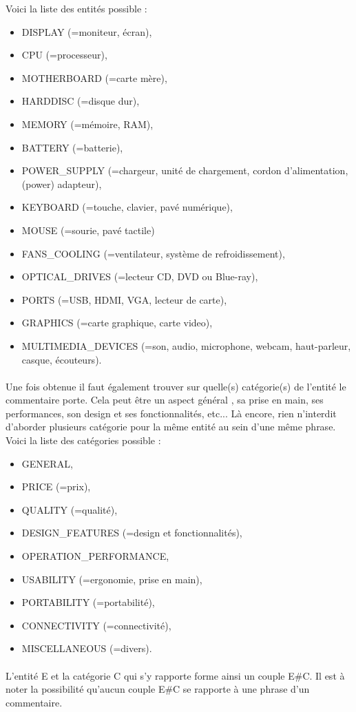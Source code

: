 \documentclass[12pt ,a4paper ]{article}
\begin{document}
\begin{multicols}{2}
\noindent Voici la liste des entités possible : 
\begin{itemize}
\item DISPLAY (=moniteur, écran), 
\item CPU (=processeur), 
\item MOTHERBOARD (=carte mère),
\item HARDDISC (=disque dur), 
\item MEMORY (=mémoire, RAM), 
\item BATTERY (=batterie), 
\item POWER\_SUPPLY (=chargeur, unité de chargement, cordon d'alimentation, (power) adapteur),
\item KEYBOARD (=touche, clavier, pavé numérique), 
\item MOUSE (=sourie, pavé tactile)
\item FANS\_COOLING (=ventilateur, système de refroidissement), 
\item OPTICAL\_DRIVES (=lecteur CD, DVD ou Blue-ray),
\item PORTS (=USB, HDMI, VGA, lecteur de carte),
\item GRAPHICS (=carte graphique, carte video),
\item MULTIMEDIA\_DEVICES (=son, audio, microphone, webcam, haut-parleur, casque, écouteurs).
\end{itemize}				

\paragraph{}
\noindent Une fois obtenue il faut également trouver sur quelle(s) catégorie(s) de l'entité le commentaire porte. Cela peut être un aspect général , sa prise en main, ses performances, son design et ses fonctionnalités, etc... Là encore, rien n'interdit d'aborder plusieurs catégorie pour la même entité au sein d'une même phrase.\\

\noindent Voici la liste des catégories possible : 
\begin{itemize}
\item GENERAL, 
\item PRICE (=prix), 
\item QUALITY (=qualité), 
\item DESIGN\_FEATURES (=design et fonctionnalités),
\item OPERATION\_PERFORMANCE, 
\item USABILITY (=ergonomie, prise en main), 
\item PORTABILITY (=portabilité),
\item CONNECTIVITY (=connectivité), 
\item MISCELLANEOUS (=divers).
\end{itemize}	

\paragraph{} 
\noindent L'entité E et la catégorie C qui s'y rapporte forme ainsi un couple E\#C. Il est à noter la possibilité qu'aucun couple E\#C se rapporte à une phrase d'un commentaire.

\end{multicols}
\end{document}
